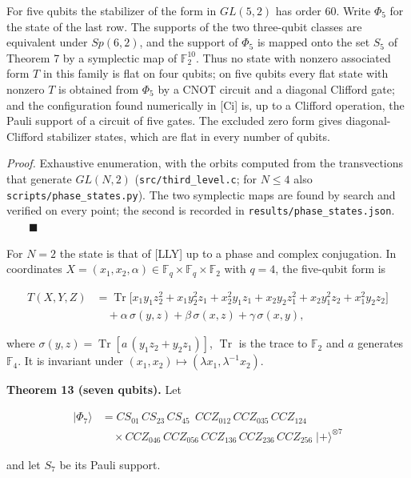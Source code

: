 \documentclass[11pt,a4paper]{article}
\begin{document}
For five qubits the stabilizer of the form in \(GL(5,2)\) has order 60. Write \(\Phi_5\) for the state of the
last row. The supports of the two three-qubit classes are equivalent under \(Sp(6,2)\), and the support
of \(\Phi_5\) is mapped onto the set \(S_5\) of Theorem 7 by a symplectic map of \(\mathbb{F}_2^{10}\). Thus no
state with nonzero associated form \(T\) in this family is flat on four qubits; on five qubits every flat
state with nonzero \(T\) is obtained from \(\Phi_5\) by
a CNOT circuit and a diagonal Clifford gate; and the configuration found numerically in {[}Ci{]} is, up to a
Clifford operation, the Pauli support of a circuit of five gates. The excluded zero form gives
diagonal-Clifford stabilizer states, which are flat in every number of qubits.

\emph{Proof.} Exhaustive enumeration, with the orbits computed from the transvections that generate
\(GL(N,2)\) (\texttt{src/third\_level.c}; for \(N \le 4\) also \nolinkurl{scripts/phase_states.py}). The two symplectic maps
are found by search and verified on every point; the second is recorded in \nolinkurl{results/phase_states.json}.
\(\qquad\blacksquare\)

For \(N = 2\) the state is that of {[}LLY{]} up to a phase and complex conjugation. In coordinates
\(X = (x_1, x_2, \alpha) \in \mathbb{F}_q \times \mathbb{F}_q \times \mathbb{F}_2\) with \(q = 4\), the
five-qubit form is

\[\begin{aligned}
T(X,Y,Z) &= \operatorname{Tr}\big[x_1y_1z_2^2 + x_1y_2^2z_1 + x_2^2y_1z_1 + x_2y_2z_1^2 + x_2y_1^2z_2 + x_1^2y_2z_2\big]\\ &\quad + \alpha\,\sigma(y,z) + \beta\,\sigma(x,z) + \gamma\,\sigma(x,y),
\end{aligned}\]

where \(\sigma(y,z) = \operatorname{Tr}[a\,(y_1z_2 + y_2z_1)]\), \(\operatorname{Tr}\) is the trace to
\(\mathbb{F}_2\) and \(a\) generates \(\mathbb{F}_4\). It is invariant under \((x_1, x_2) \mapsto (\lambda x_1, \lambda^{-1}x_2)\).

\textbf{Theorem 13 (seven qubits).} Let

\[\begin{aligned}
|\Phi_7\rangle &= CS_{01}\,CS_{23}\,CS_{45}\;\, CCZ_{012}\,CCZ_{035}\,CCZ_{124}\\ &\quad \times CCZ_{046}\,CCZ_{056}\,CCZ_{136}\,CCZ_{236}\,CCZ_{256}\; |{+}\rangle^{\otimes 7}
\end{aligned}\]

and let \(S_7\) be its Pauli support.
\end{document}
